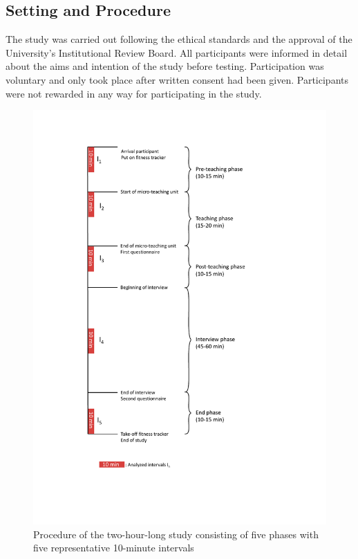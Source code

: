 \documentclass[]{elsarticle} %
\begin{document}
\hypertarget{setting-and-procedure}{%
\subsection{Setting and Procedure}\label{setting-and-procedure}}

The study was carried out following the ethical standards and the
approval of the University's Institutional Review Board. All
participants were informed in detail about the aims and intention of the
study before testing. Participation was voluntary and only took place
after written consent had been given. Participants were not rewarded in
any way for participating in the study.

\begin{figure}[htbp]
  \centering
  \includegraphics[width=1\textwidth]{images/Timeline.pdf}
  \caption{Procedure of the two-hour-long study consisting of five phases with five representative 10-minute intervals}
  \label{Procedure of the two-hour-long study consisting of five phases with five representative 10-minute intervals}
\end{figure}
\end{document}
